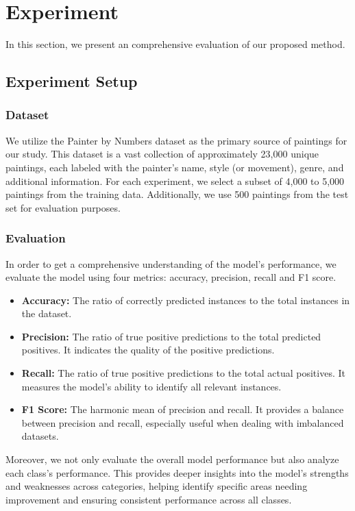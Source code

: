 \section{Experiment}
\label{sec:experiment}
In this section, we present an comprehensive evaluation of our proposed method.
\subsection{Experiment Setup}
\subsubsection{Dataset}We utilize the Painter by Numbers dataset \cite{painter_by_numbers} as
the primary source of paintings for our study. This dataset is a vast collection of approximately 23,000 unique paintings, each labeled with the painter's name, style (or movement), genre, and additional information\cite{artnet}. For each experiment, we select a subset of 4,000 to 5,000 paintings from the training data. Additionally, we use 500 paintings from the test set for evaluation purposes.
\subsubsection{Evaluation}In order to get a comprehensive understanding of the model's performance, we evaluate the model using four metrics: accuracy, precision, recall and F1 score. 
\begin{itemize}
    \item \textbf{Accuracy:} The ratio of correctly predicted instances to the total instances in the dataset.
    \item \textbf{Precision:} The ratio of true positive predictions to the total predicted positives. It indicates the quality of the positive predictions.
    \item \textbf{Recall:} The ratio of true positive predictions to the total actual positives. It measures the model's ability to identify all relevant instances.
    \item \textbf{F1 Score:} The harmonic mean of precision and recall. It provides a balance between precision and recall, especially useful when dealing with imbalanced datasets.
\end{itemize}
Moreover, we not only evaluate the overall model performance but also analyze each class's performance. This provides deeper insights into the model's strengths and weaknesses across categories, helping identify specific areas needing improvement and ensuring consistent performance across all classes.
